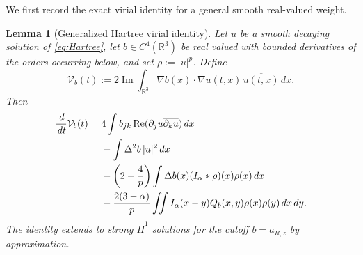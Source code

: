 \documentclass[preprint,12pt]{elsarticle}
\numberwithin{equation}{section}
\newtheorem{lemma}[theorem]{Lemma}
\theoremstyle{remark}
\newcommand{\R}{\mathbb R}
\newcommand{\dd}{\,d}
\newcommand{\Vcal}{\mathcal V}
\begin{document}
We first record the exact virial identity for a general smooth real-valued weight.

\begin{lemma}[Generalized Hartree virial identity]\label{lem:Hartree-virial-identity}
Let $u$ be a smooth decaying solution of \eqref{eq:Hartree}, let $b\in C^4(\R^3)$ be real valued with bounded derivatives of the orders occurring below, and set $\rho:=|u|^p$. Define
\[
  \Vcal_b(t):=2\operatorname{Im}\int_{\R^3}
  \nabla b(x)\cdot\nabla u(t,x)\,\overline{u(t,x)}\dd x.
\]
Then
\begin{align}
 \frac{\dd}{\dd t}\Vcal_b(t)
 ={}&4\int b_{jk}
 \operatorname{Re}(\partial_ju\overline{\partial_ku})\dd x\notag\\
 &-\int\Delta^2b\,|u|^2\dd x\notag\\
 &-\left(2-\frac4p\right)
 \int\Delta b(x)(I_\alpha*\rho)(x)\rho(x)\dd x\notag\\
 &-\frac{2(3-\alpha)}p
 \iint I_\alpha(x-y)Q_b(x,y)\rho(x)\rho(y)\dd x\dd y.
 \label{eq:Hartree-virial-general}
\end{align}
The identity extends to strong $\dot H^1$ solutions for the cutoff $b=a_{R,z}$ by approximation.
\end{lemma}
\end{document}

